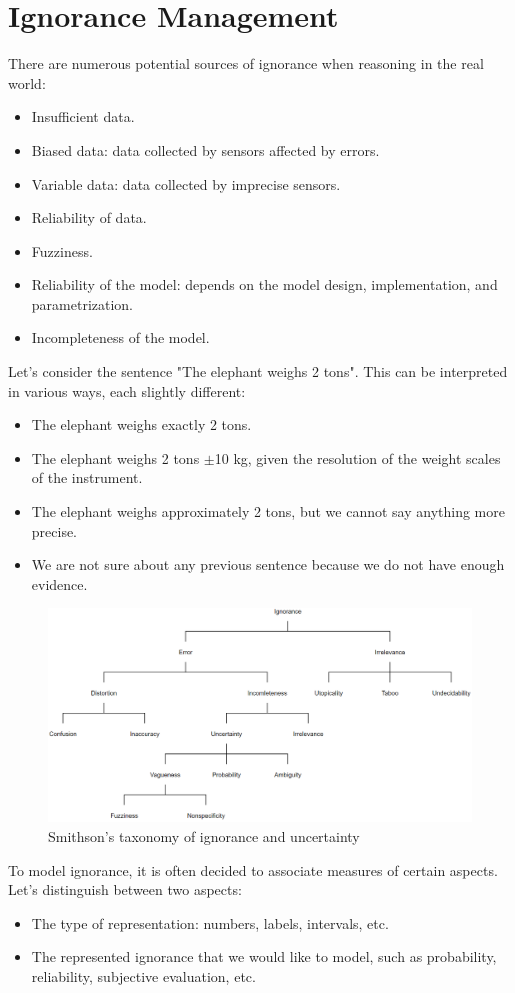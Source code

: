 \section{Ignorance Management}

There are numerous potential sources of ignorance when reasoning in the real world:
\begin{itemize}
    \item Insufficient data.
    \item Biased data: data collected by sensors affected by errors.
    \item Variable data: data collected by imprecise sensors.
    \item Reliability of data.
    \item Fuzziness.
    \item Reliability of the model: depends on the model design, implementation, and parametrization.
    \item Incompleteness of the model.
\end{itemize}
\begin{example}
    Let's consider the sentence "The elephant weighs 2 tons". This can be interpreted in various ways, each slightly different:
    \begin{itemize}
        \item The elephant weighs exactly 2 tons.
        \item The elephant weighs 2 tons $\pm$10 kg, given the resolution of the weight scales of the instrument.
        \item The elephant weighs approximately 2 tons, but we cannot say anything more precise.
        \item We are not sure about any previous sentence because we do not have enough evidence.
    \end{itemize}
\end{example}
\begin{figure}[H]
    \centering
    \includegraphics[width=0.75\linewidth]{images/smithson.png}
    \caption{Smithson's taxonomy of ignorance and uncertainty}
\end{figure}
To model ignorance, it is often decided to associate measures of certain aspects. Let's distinguish between two aspects:
\begin{itemize}
    \item The type of representation: numbers, labels, intervals, etc.
    \item The represented ignorance that we would like to model, such as probability, reliability, subjective evaluation, etc.
\end{itemize}

